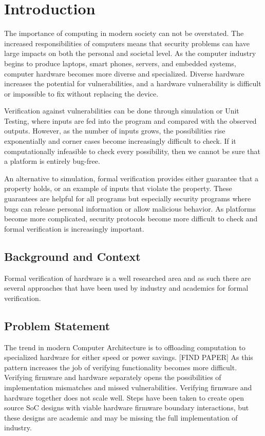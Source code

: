 \documentclass[../report.tex]{subfiles}
\begin{document}
\onehalfspacing

\section{Introduction}

The importance of computing in modern society can not be overstated. The increased responsibilities of computers means that security problems can have large impacts on both the personal and societal level.  As the computer industry begins to produce laptops, smart phones, servers, and embedded systems, computer hardware becomes more diverse and specialized. Diverse hardware increases the potential for vulnerabilities, and a hardware vulnerability is difficult or impossible
to fix without replacing the device. 

Verification against vulnerabilities can be done through simulation or Unit Testing, where inputs are fed into the program and compared with the observed outputs. However, as the number of inputs grows, the possibilities rise exponentially and corner cases become increasingly difficult to check. If it computationally infeasible to check every possibility, then we cannot be sure that a platform is entirely bug-free.

An alternative to simulation, formal verification provides either guarantee that a property holds, or an example of inputs that violate the property. These guarantees are helpful for all programs but especially security programs where bugs can release personal information or allow malicious behavior. As platforms become more complicated, security protocols become more difficult to check and formal verification is increasingly important.

\subsection{Background and Context}
Formal verification of hardware is a well researched area and as such there are several approaches that have been used by industry and academics for formal verification.

\subsection{Problem Statement}
The trend in modern Computer Architecture is to offloading computation to specialized hardware for either speed or power savings. [FIND PAPER] As this pattern increases the job of verifying functionality  becomes more difficult. Verifying firmware and hardware separately opens the possibilities of implementation mismatches and missed vulnerabilities. Verifying firmware and hardware together does not scale well. Steps have been taken to create open source SoC designs with viable hardware firmware boundary interactions, but these designs are academic and may be missing the full implementation of industry. 
\end{document}
